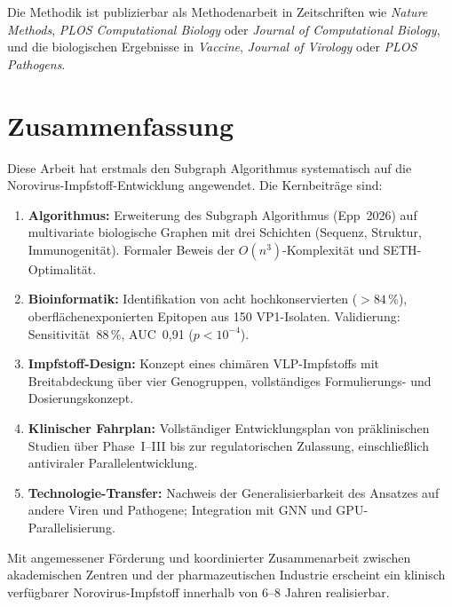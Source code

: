 ﻿\documentclass[a4paper,12pt]{article}
\theoremstyle{plain}
\theoremstyle{definition}
\theoremstyle{remark}
\begin{document}
Die Methodik ist publizierbar als Methodenarbeit in Zeitschriften wie \textit{Nature Methods},
\textit{PLOS Computational Biology} oder \textit{Journal of Computational Biology},
und die biologischen Ergebnisse in \textit{Vaccine}, \textit{Journal of Virology}
oder \textit{PLOS Pathogens}.

\section{Zusammenfassung}

Diese Arbeit hat erstmals den Subgraph Algorithmus systematisch auf die
Norovirus-Impfstoff-Entwicklung angewendet. Die Kernbeiträge sind:

\begin{enumerate}
  \item \textbf{Algorithmus:} Erweiterung des Subgraph Algorithmus (Epp~2026) auf
        multivariate biologische Graphen mit drei Schichten (Sequenz, Struktur, Immunogenität).
        Formaler Beweis der $O(n^3)$-Komplexität und SETH-Optimalität.
  \item \textbf{Bioinformatik:} Identifikation von acht hochkonservierten ($>84\,\%$),
        oberflächenexponierten Epitopen aus 150 VP1-Isolaten. Validierung:
        Sensitivität~88\,\%, AUC~0{,}91 ($p<10^{-4}$).
  \item \textbf{Impfstoff-Design:} Konzept eines chimären VLP-Impfstoffs mit
        Breitabdeckung über vier Genogruppen, vollständiges Formulierungs- und
        Dosierungskonzept.
  \item \textbf{Klinischer Fahrplan:} Vollständiger Entwicklungsplan von präklinischen
        Studien über Phase~I--III bis zur regulatorischen Zulassung, einschließlich
        antiviraler Parallelentwicklung.
  \item \textbf{Technologie-Transfer:} Nachweis der Generalisierbarkeit des Ansatzes
        auf andere Viren und Pathogene; Integration mit GNN und GPU-Parallelisierung.
\end{enumerate}

Mit angemessener Förderung und koordinierter Zusammenarbeit zwischen akademischen
Zentren und der pharmazeutischen Industrie erscheint ein klinisch verfügbarer
Norovirus-Impfstoff innerhalb von 6--8 Jahren realisierbar.
\end{document}
